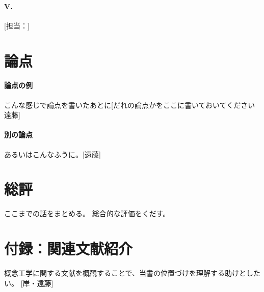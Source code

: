 \documentclass[dvipdfmx,autodetect-engine]{jsarticle}
\begin{document}
\paragraph{V. }
\textbf{}
[担当：]

\section{論点}
\paragraph{論点の例}
こんな感じで論点を書いたあとに[だれの論点かをここに書いておいてください　遠藤]

\paragraph{別の論点}
あるいはこんなふうに。[遠藤]

\paragraph{}

\section{総評}
ここまでの話をまとめる。
総合的な評価をくだす。


\section*{付録：関連文献紹介}
概念工学に関する文献を概観することで、当書の位置づけを理解する助けとしたい。
[岸・遠藤]

\printbibliography
\end{document}
